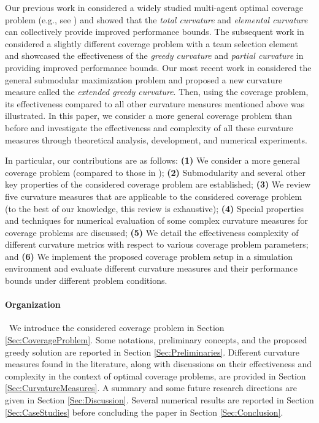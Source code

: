 \documentclass[letterpaper, 10 pt, conference]{ieeeconf}
\begin{document}
Our previous work in \cite{Sun2019} considered a widely studied multi-agent optimal coverage problem (e.g., see \cite{Zhong2011,Welikala2019J1}) and showed that the \emph{total curvature} \cite{Conforti1984} and \emph{elemental curvature} \cite{Wang2016} can collectively provide improved performance bounds. The subsequent work in \cite{Sun2020} considered a slightly different coverage problem with a team selection element and showcased the effectiveness of the \emph{greedy curvature} \cite{Conforti1984} and \emph{partial curvature} \cite{Liu2018} in providing improved performance bounds. Our most recent work in \cite{WelikalaJ02021} considered the general submodular maximization problem and proposed a new curvature measure called the \emph{extended greedy curvature}. Then, using the coverage problem, its effectiveness compared to all other curvature measures mentioned above was illustrated. 
In this paper, we consider a more general coverage problem than before and investigate the effectiveness and complexity of all these curvature measures through theoretical analysis, development, and numerical experiments. 
   


In particular, our contributions are as follows: 
\textbf{(1)} We consider a more general coverage problem (compared to those in \cite{WelikalaJ02021,Sun2019});
\textbf{(2)} Submodularity and several other key properties of the considered coverage problem are established; 
\textbf{(3)} We review five curvature measures that are applicable to the considered coverage problem (to the best of our knowledge, this review is exhaustive);
\textbf{(4)} Special properties and techniques for numerical evaluation of some complex curvature measures for coverage problems are discussed; 
\textbf{(5)} We detail the effectiveness complexity of different curvature metrics with respect to various coverage problem parameters; and 
\textbf{(6)} We implement the proposed coverage problem setup in a simulation environment and evaluate different curvature measures and their performance bounds under different problem conditions.






\paragraph*{Organization}\ 
We introduce the considered coverage problem in Section \ref{Sec:CoverageProblem}. Some notations, preliminary concepts, and the proposed greedy solution are reported in Section \ref{Sec:Preliminaries}. Different curvature measures found in the literature, along with discussions on their effectiveness and complexity in the context of optimal coverage problems, are provided in Section \ref{Sec:CurvatureMeasures}. 
A summary and some future research directions are given in Section \ref{Sec:Discussion}. 
Several numerical results are reported in Section \ref{Sec:CaseStudies} before concluding the paper in Section \ref{Sec:Conclusion}. 
\end{document}
